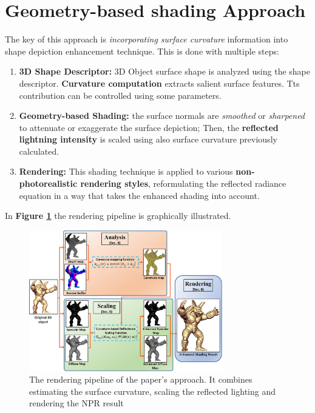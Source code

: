 \section{Geometry-based shading Approach}
The key of this approach is  \textit{incorporating surface curvature} information into shape depiction enhancement technique. This is done with multiple steps:
\begin{enumerate}
	\item  \textbf{3D Shape Descriptor:} 3D Object surface shape is analyzed using the shape descriptor. \textbf{Curvature computation} extracts salient surface features. Tts contribution can be controlled using some parameters.
	\item \textbf{Geometry-based Shading:} the surface normals are \textit{smoothed} or \textit{sharpened} to attenuate or exaggerate the surface depiction; Then, the \textbf{reflected lightning intensity} is scaled using also surface curvature previously calculated.
	\item \textbf{Rendering:} This shading technique is applied to various \textbf{non-photorealistic rendering styles}, reformulating the reflected radiance equation in a way that takes the enhanced shading into account.
\end{enumerate}
In \textbf{Figure \ref{fig:method}} the rendering pipeline is graphically illustrated.
\begin{figure}[h]
	\centering
	\includegraphics[width=0.75\textwidth]{Images/method.png}
	\caption{The rendering pipeline of the paper's approach. It combines estimating the surface curvature, scaling the reflected lighting and rendering the NPR result}
	\label{fig:method}
\end{figure}